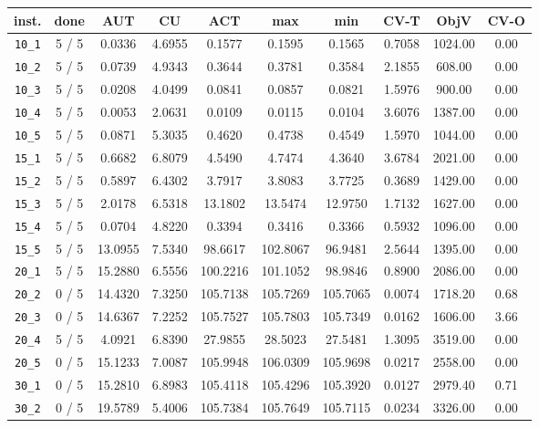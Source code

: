 \begin{table}[h!]
\begin{center}
\small
\begin{tabular}{| c | c | c | c | c | c | c | c | c | c |}
\hline
inst. & done & AUT & CU & ACT & max & min & CV-T & ObjV & CV-O \\
\hline
\verb|10_1| & 5 / 5 & 0.0336 & 4.6955 & 0.1577 & 0.1595 & 0.1565 & 0.7058 & 1024.00 & 0.00\\ 
\verb|10_2| & 5 / 5 & 0.0739 & 4.9343 & 0.3644 & 0.3781 & 0.3584 & 2.1855 & 608.00 & 0.00\\ 
\verb|10_3| & 5 / 5 & 0.0208 & 4.0499 & 0.0841 & 0.0857 & 0.0821 & 1.5976 & 900.00 & 0.00\\ 
\verb|10_4| & 5 / 5 & 0.0053 & 2.0631 & 0.0109 & 0.0115 & 0.0104 & 3.6076 & 1387.00 & 0.00\\ 
\verb|10_5| & 5 / 5 & 0.0871 & 5.3035 & 0.4620 & 0.4738 & 0.4549 & 1.5970 & 1044.00 & 0.00\\ 
\verb|15_1| & 5 / 5 & 0.6682 & 6.8079 & 4.5490 & 4.7474 & 4.3640 & 3.6784 & 2021.00 & 0.00\\ 
\verb|15_2| & 5 / 5 & 0.5897 & 6.4302 & 3.7917 & 3.8083 & 3.7725 & 0.3689 & 1429.00 & 0.00\\ 
\verb|15_3| & 5 / 5 & 2.0178 & 6.5318 & 13.1802 & 13.5474 & 12.9750 & 1.7132 & 1627.00 & 0.00\\ 
\verb|15_4| & 5 / 5 & 0.0704 & 4.8220 & 0.3394 & 0.3416 & 0.3366 & 0.5932 & 1096.00 & 0.00\\ 
\verb|15_5| & 5 / 5 & 13.0955 & 7.5340 & 98.6617 & 102.8067 & 96.9481 & 2.5644 & 1395.00 & 0.00\\ 
\verb|20_1| & 5 / 5 & 15.2880 & 6.5556 & 100.2216 & 101.1052 & 98.9846 & 0.8900 & 2086.00 & 0.00\\ 
\verb|20_2| & 0 / 5 & 14.4320 & 7.3250 & 105.7138 & 105.7269 & 105.7065 & 0.0074 & 1718.20 & 0.68\\ 
\verb|20_3| & 0 / 5 & 14.6367 & 7.2252 & 105.7527 & 105.7803 & 105.7349 & 0.0162 & 1606.00 & 3.66\\ 
\verb|20_4| & 5 / 5 & 4.0921 & 6.8390 & 27.9855 & 28.5023 & 27.5481 & 1.3095 & 3519.00 & 0.00\\ 
\verb|20_5| & 0 / 5 & 15.1233 & 7.0087 & 105.9948 & 106.0309 & 105.9698 & 0.0217 & 2558.00 & 0.00\\ 
\verb|30_1| & 0 / 5 & 15.2810 & 6.8983 & 105.4118 & 105.4296 & 105.3920 & 0.0127 & 2979.40 & 0.71\\ 
\verb|30_2| & 0 / 5 & 19.5789 & 5.4006 & 105.7384 & 105.7649 & 105.7115 & 0.0234 & 3326.00 & 0.00\\ 

\end{tabular}
\end{center}
\end{table}
